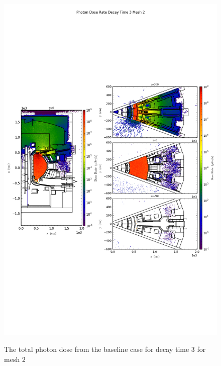 \begin{figure}[ht!]
\centering
\includegraphics[trim={0cm 9cm 0cm 10cm},clip,scale=0.75]{../plots/final_model_nob4c/Photon_Dose_Rate_Decay_Time_3_Mesh_2.png}
\label{fig:photons_dc3_no4bc_m2_flux}
\caption{The total photon dose from the baseline case for decay time 3 for mesh 2}
\end{figure}

